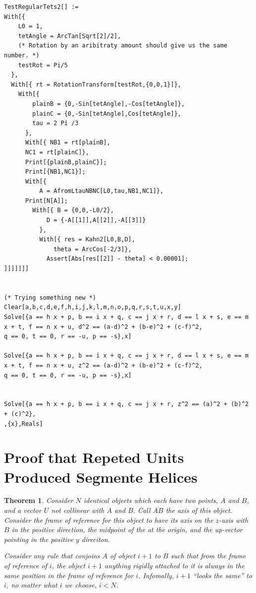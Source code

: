 \documentclass[11pt]{article}
\newtheorem{theorem}{Theorem}
\begin{document}
{\begin{verbatim}
TestRegularTets2[] :=
With[{
    L0 = 1,
    tetAngle = ArcTan[Sqrt[2]/2],
    (* Rotation by an aribitraty amount should give us the same number. *)
    testRot = Pi/5
  },
  With[{ rt = RotationTransform[testRot,{0,0,1}]},
    With[{
        plainB = {0,-Sin[tetAngle],-Cos[tetAngle]},
        plainC = {0,-Sin[tetAngle],Cos[tetAngle]},
        tau = 2 Pi /3
      },
      With[{ NB1 = rt[plainB],
      NC1 = rt[plainC]},
      Print[{plainB,plainC}];
      Print[{NB1,NC1}];
      With[{
          A = AfromLtauNBNC[L0,tau,NB1,NC1]},
      Print[N[A]];
        With[{ B = {0,0,-L0/2},
            D = {-A[[1]],A[[2]],-A[[3]]}
          },
          With[{ res = Kahn2[L0,B,D],
              theta = ArcCos[-2/3]},
            Assert[Abs[res[[2]] - theta] < 0.00001];
]]]]]]]


(* Trying something new *)
Clear[a,b,c,d,e,f,h,i,j,k,l,m,n,o,p,q,r,s,t,u,x,y]
Solve[{a == h x + p, b == i x + q, c == j x + r, d == l x + s, e == m x + t, f == n x + u, d^2 == (a-d)^2 + (b-e)^2 + (c-f)^2,
q == 0, t == 0, r == -u, p == -s},x]

Solve[{a == h x + p, b == i x + q, c == j x + r, d == l x + s, e == m x + t, f == n x + u, z^2 == (a-d)^2 + (b-e)^2 + (c-f)^2,
q == 0, t == 0, r == -u, p == -s},x]


Solve[{a == h x + p, b == i x + q, c == j x + r, z^2 == (a)^2 + (b)^2 + (c)^2},
,{x},Reals]

\end{verbatim}

\section{Proof that Repeted Units Produced Segmente Helices}

\begin{theorem}
  Consider $N$ identical objects which each have two points, $A$ and $B$,
  and a vector $U$ not collinear with $A$ and $B$. Call
  $\overline{AB}$ the axis of this object.
  Consider the frame of reference for this object to have
  its axis on the $z$-axis with $B$ in the positive direction, the
  midpoint of the at the origin, and the up-vector pointing in the positive $y$ direciton.

  Consider any rule that conjoins $A$ of object $i+1$ to $B$ such that
  from the frame of reference of $i$, the object $i+1$ anything rigidly
  attached to it is always in the same position in the frame of reference for $i$.
  Infomally, $i+1$ ``looks the same'' to $i$, no matter what $i$ we choose, $i < N$.


\end{theorem}}
\end{document}
